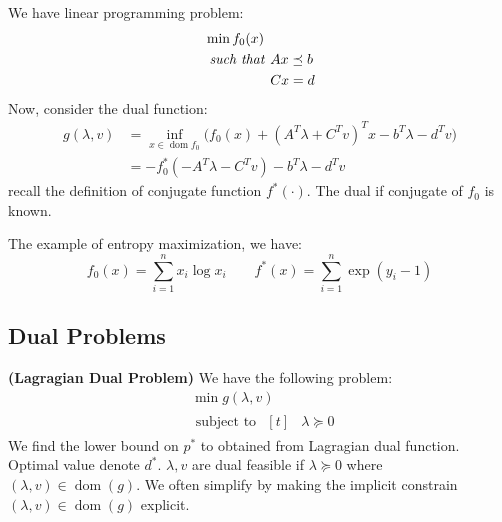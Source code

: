 \begin{proposition}
    We have linear programming problem:
    \begin{equation*}
    \begin{aligned}
        &\min f_0(x) \\
        &\text{\emph{ such that }} \begin{aligned}[t]
            &Ax\preceq b \\
            &Cx=d
        \end{aligned}
    \end{aligned}
    \end{equation*} 
    Now, consider the dual function:
    \begin{equation*}
    \begin{aligned}
        g(\lambda, v) &= \inf_{x\in\operatorname{dom}f_0} \Big( f_0(x) + (A^T\lambda + C^Tv)^Tx - b^T\lambda - d^Tv \Big) \\
        &= -f^*_0(-A^T\lambda - C^Tv) - b^T\lambda - d^Tv
    \end{aligned}
    \end{equation*}
    recall the definition of conjugate function $f^*(\cdot)$. The dual if conjugate of $f_0$ is known. 
\end{proposition}

\begin{remark}
    The example of entropy maximization, we have:
    \begin{equation*}
        f_0(x) = \sum^n_{i=1}x_i\log x_i \qquad f^*(x) = \sum^n_{i=1}\exp(y_i-1)
    \end{equation*} 
\end{remark}

\subsection{Dual Problems}

\begin{definition}{\textbf{(Lagragian Dual Problem)}}
    We have the following problem:
    \begin{equation*}
    \begin{aligned}
        &\min g(\lambda, v) \\
        &\text{ subject to } \begin{aligned}[t]
            &\lambda\succeq0
        \end{aligned}
    \end{aligned}
    \end{equation*} 
    We find the lower bound on $p^*$ to obtained from Lagragian dual function. Optimal value denote $d^*$. $\lambda, v$ are dual feasible if $\lambda\succeq0$ where $(\lambda, v)\in\operatorname{dom}(g)$. We often simplify by making the implicit constrain $(\lambda, v)\in\operatorname{dom}(g)$ explicit.
\end{definition}

